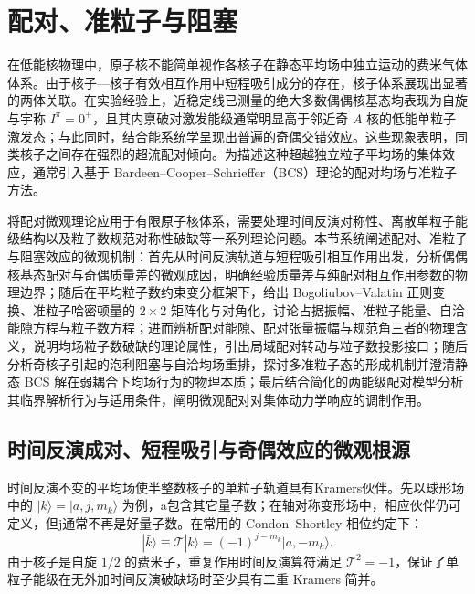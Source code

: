 \section{配对、准粒子与阻塞}\label{sec:2-3}


在低能核物理中，原子核不能简单视作各核子在静态平均场中独立运动的费米气体体系。由于核子—核子有效相互作用中短程吸引成分的存在，核子体系展现出显著的两体关联。在实验经验上，近稳定线已测量的绝大多数偶偶核基态均表现为自旋与宇称 $I^\pi = 0^+$，且其内禀破对激发能级通常明显高于邻近奇 $A$ 核的低能单粒子激发态；与此同时，结合能系统学呈现出普遍的奇偶交错效应。这些现象表明，同类核子之间存在强烈的超流配对倾向。为描述这种超越独立粒子平均场的集体效应，通常引入基于 Bardeen–Cooper–Schrieffer（BCS）理论的配对均场与准粒子方法\cite{book-suhonen-from-nucleons-to-nucleus, book-jain-nuclear-isomers}。

将配对微观理论应用于有限原子核体系，需要处理时间反演对称性、离散单粒子能级结构以及粒子数规范对称性破缺等一系列理论问题。本节系统阐述配对、准粒子与阻塞效应的微观机制：首先从时间反演轨道与短程吸引相互作用出发，分析偶偶核基态配对与奇偶质量差的微观成因，明确经验质量差与纯配对相互作用参数的物理边界；随后在平均粒子数约束变分框架下，给出 Bogoliubov–Valatin 正则变换、准粒子哈密顿量的 $2\times 2$ 矩阵化与对角化，讨论占据振幅、准粒子能量、自洽能隙方程与粒子数方程；进而辨析配对能隙、配对张量振幅与规范角三者的物理含义，说明均场粒子数破缺的理论属性，引出局域配对转动与粒子数投影接口；随后分析奇核子引起的泡利阻塞与自洽均场重排，探讨多准粒子态的形成机制并澄清静态 BCS 解在弱耦合下均场行为的物理本质；最后结合简化的两能级配对模型分析其临界解析行为与适用条件，阐明微观配对对集体动力学响应的调制作用。



\subsection{时间反演成对、短程吸引与奇偶效应的微观根源}\label{sec:2-3-1}


时间反演不变的平均场使半整数核子的单粒子轨道具有Kramers伙伴。先以球形场中的 $|k\rangle=|a,j,m_k\rangle$ 为例，a包含其它量子数；在轴对称变形场中，相应伙伴仍可定义，但j通常不再是好量子数。在常用的 Condon–Shortley 相位约定下\cite{book-suhonen-from-nucleons-to-nucleus}：
\begin{equation}\label{eq:2-3-1}
|\bar{k}\rangle \equiv \mathcal{T} |k\rangle = (-1)^{j - m_k} |a, -m_k\rangle.
\end{equation}
由于核子是自旋 $1/2$ 的费米子，重复作用时间反演算符满足 $\mathcal{T}^2 = -1$，保证了单粒子能级在无外加时间反演破缺场时至少具有二重 Kramers 简并。

